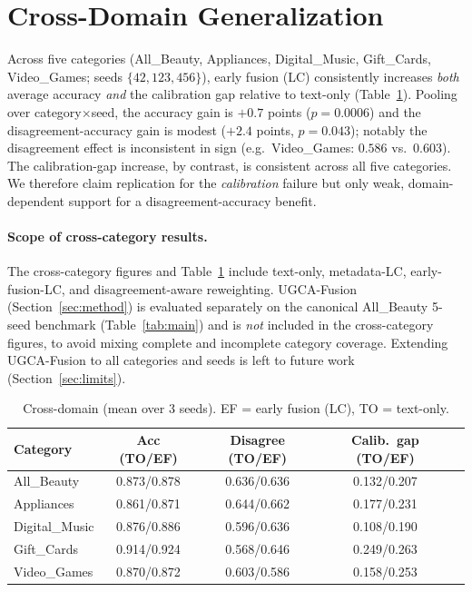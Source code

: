 \documentclass[11pt]{article}
\begin{document}
\section{Cross-Domain Generalization}\label{sec:cross}
Across five categories (All\_Beauty, Appliances, Digital\_Music, Gift\_Cards,
Video\_Games; seeds $\{42,123,456\}$), early fusion (LC) consistently increases
\emph{both} average accuracy \emph{and} the calibration gap relative to text-only
(Table~\ref{tab:cross}). Pooling over category$\times$seed, the accuracy gain is
$+0.7$ points ($p{=}0.0006$) and the disagreement-accuracy gain is modest
($+2.4$ points, $p{=}0.043$); notably the disagreement effect is inconsistent
in sign (e.g.\ Video\_Games: $0.586$ vs.\ $0.603$). The calibration-gap increase,
by contrast, is consistent across all five categories. We therefore claim
replication for the \emph{calibration} failure but only weak, domain-dependent
support for a disagreement-accuracy benefit.

\paragraph{Scope of cross-category results.} The cross-category figures and
Table~\ref{tab:cross} include text-only, metadata-LC, early-fusion-LC, and
disagreement-aware reweighting. UGCA-Fusion (Section~\ref{sec:method}) is
evaluated separately on the canonical All\_Beauty 5-seed benchmark
(Table~\ref{tab:main}) and is \emph{not} included in the cross-category figures,
to avoid mixing complete and incomplete category coverage. Extending UGCA-Fusion
to all categories and seeds is left to future work (Section~\ref{sec:limits}).

\begin{table}[t]\centering
\caption{Cross-domain (mean over 3 seeds). EF = early fusion (LC), TO = text-only.}
\label{tab:cross}
\small
\begin{tabular}{lcccc}
\toprule
Category & Acc (TO/EF) & Disagree (TO/EF) & Calib.\ gap (TO/EF)\\
\midrule
All\_Beauty    & 0.873/0.878 & 0.636/0.636 & 0.132/0.207\\
Appliances     & 0.861/0.871 & 0.644/0.662 & 0.177/0.231\\
Digital\_Music & 0.876/0.886 & 0.596/0.636 & 0.108/0.190\\
Gift\_Cards    & 0.914/0.924 & 0.568/0.646 & 0.249/0.263\\
Video\_Games   & 0.870/0.872 & 0.603/0.586 & 0.158/0.253\\
\bottomrule
\end{tabular}
\end{table}
\end{document}
